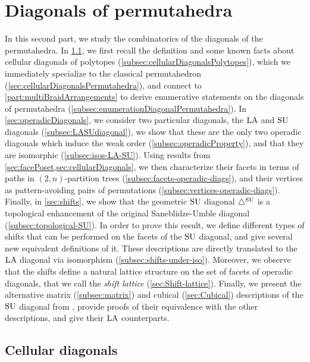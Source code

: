 \chapter{Diagonals of permutahedra}
\label{part:diagonalsPermutahedra}

In this second part, we study the combinatorics of the diagonals of the permutahedra.
In \cref{sec:cellularDiagonals}, we first recall the definition and some known facts about cellular diagonals of polytopes (\cref{subsec:cellularDiagonalsPolytopes}), which we immediately specialize to the classical permutahedron (\cref{sec:cellularDiagonalsPermutahedra}), and connect to \cref{part:multiBraidArrangements} to derive enumerative statements on the diagonals of permutahedra (\cref{subsec:enumerationDiagonalPermutahedra}).
In \cref{sec:operadicDiagonals}, we consider two particular diagonals, the $\mathrm{LA}$ and $\mathrm{SU}$ diagonals (\cref{subsec:LASUdiagonal}), we show that these are the only two operadic diagonals which induce the weak order (\cref{subsec:operadicProperty}), and that they are isomorphic (\cref{subsec:isos-LA-SU}). 
Using results from \cref{sec:facePoset,sec:cellularDiagonals}, we then characterize their facets in terms of paths in $(2,n)$-partition trees (\cref{subsec:facets-operadic-diags}), and their vertices as pattern-avoiding pairs of permutations (\cref{subsec:vertices-operadic-diags}).
Finally, in \cref{sec:shifts}, we show that the geometric $\mathrm{SU}$ diagonal $\triangle^{\mathrm{SU}}$ is a topological enhancement of the original Saneblidze-Umble diagonal~\cite{SaneblidzeUmble} (\cref{subsec:topological-SU}).
In order to prove this result, we define different types of shifts that can be performed on the facets of the $\mathrm{SU}$ diagonal, and give several new equivalent definitions of it. 
These descriptions are directly translated to the $\mathrm{LA}$ diagonal via isomorphism (\cref{subsec:shifts-under-iso}).
Moreover, we observe that the shifts define a natural lattice structure on the set of facets of operadic diagonals, that we call the \emph{shift lattice} (\cref{sec:Shift-lattice}).
Finally, we present the alternative matrix (\cref{subsec:matrix}) and cubical (\cref{sec:Cubical}) descriptions of the $\mathrm{SU}$ diagonal from \cite{SaneblidzeUmble,SaneblidzeUmble-comparingDiagonals}, provide proofs of their equivalence with the other descriptions, and give their $\mathrm{LA}$ counterparts. 


\section{Cellular diagonals}
\label{sec:cellularDiagonals}


